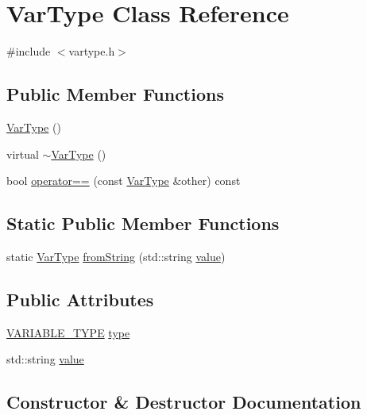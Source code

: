 \hypertarget{classVarType}{}\section{Var\+Type Class Reference}
\label{classVarType}


{\ttfamily \#include $<$vartype.\+h$>$}

\subsection*{Public Member Functions}
\begin{DoxyCompactItemize}
\item 
\hyperlink{classVarType_adddd6258ae800047f968361615eff16b}{Var\+Type} ()
\item 
virtual \hyperlink{classVarType_af090ea0ac8270c1566c592bd9b3df2e6}{$\sim$\+Var\+Type} ()
\item 
bool \hyperlink{classVarType_a28323b657730e9b806f4b87af777de43}{operator==} (const \hyperlink{classVarType}{Var\+Type} \&other) const
\end{DoxyCompactItemize}
\subsection*{Static Public Member Functions}
\begin{DoxyCompactItemize}
\item 
static \hyperlink{classVarType}{Var\+Type} \hyperlink{classVarType_ae9fb7114144fc70d399962c25ea24b9c}{from\+String} (std\+::string \hyperlink{classVarType_adeb99cb6a17ce9cee53c165c912a333f}{value})
\end{DoxyCompactItemize}
\subsection*{Public Attributes}
\begin{DoxyCompactItemize}
\item 
\hyperlink{statics_8h_a4c85b3a98d55cc0252806c950379cce0}{V\+A\+R\+I\+A\+B\+L\+E\+\_\+\+T\+Y\+PE} \hyperlink{classVarType_ada5e661872d79bc92631a1ac384d459e}{type}
\item 
std\+::string \hyperlink{classVarType_adeb99cb6a17ce9cee53c165c912a333f}{value}
\end{DoxyCompactItemize}


\subsection{Constructor \& Destructor Documentation}
\mbox{\label{classVarType_adddd6258ae800047f968361615eff16b}} 
